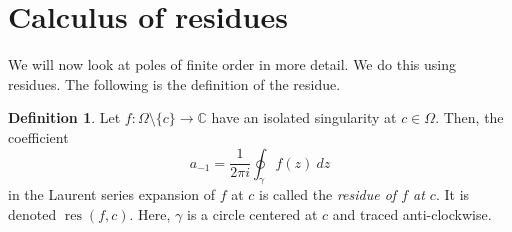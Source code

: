 \documentclass[a4paper, openany]{memoir}
\theoremstyle{definition}
\newtheorem{definition}{Definition}[section]
\theoremstyle{plain}
\begin{document}
\newpage

\section{Calculus of residues}
We will now look at poles of finite order in more detail. We do this using residues. The following is the definition of the residue.
\begin{definition}
    Let $f: \Omega \setminus \{c\} \to \mathbb{C}$ have an isolated singularity at $c \in \Omega$. Then, the coefficient
    \[a_{-1} = \frac{1}{2\pi i} \oint_\gamma f(z) \ dz\]
    in the Laurent series expansion of $f$ at $c$ is called the \emph{residue of $f$ at $c$}. It is denoted $\operatorname{res}(f, c)$. Here, $\gamma$ is a circle centered at $c$ and traced anti-clockwise.
\end{definition}
\end{document}
